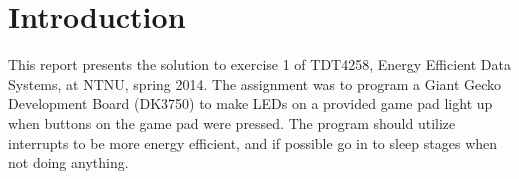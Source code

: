 \section{Introduction}

This report presents the solution to exercise 1 of TDT4258, Energy Efficient Data Systems, at NTNU, spring 2014.
The assignment was to program a Giant Gecko Development Board (DK3750) to make LEDs on a provided game pad light up when buttons on the game pad were pressed.
The program should utilize interrupts to be more energy efficient, and if possible go in to sleep stages when not doing anything.


